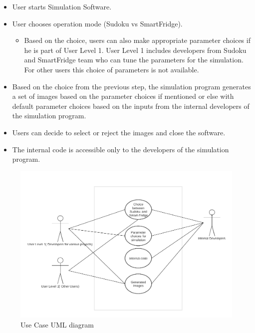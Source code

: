 \documentclass[a4paper,12pt]{article}
\begin{document}
\begin{itemize}
\item User starts Simulation Software.

\item User chooses operation mode (Sudoku vs SmartFridge).
\begin{itemize}
\item Based on the choice, users can also make appropriate parameter choices if he is part of User Level 1. User Level 1 includes developers from Sudoku and SmartFridge team who can tune the parameters for the simulation. For other users this choice of parameters is not available.
\end{itemize}
\item Based on the choice from the previous step, the simulation program generates a set of images based on the parameter choices if mentioned or else with default parameter choices based on the inputs from the internal developers of the simulation program.
\item Users can decide to select or reject the images and close the software.
\item The internal code is accessible only to the developers of the simulation program.
\end{itemize}
 \begin{figure}[H]
\includegraphics[scale=0.45]{usecase.png}
\caption{Use Case UML diagram}
\end{figure}
\end{document}
